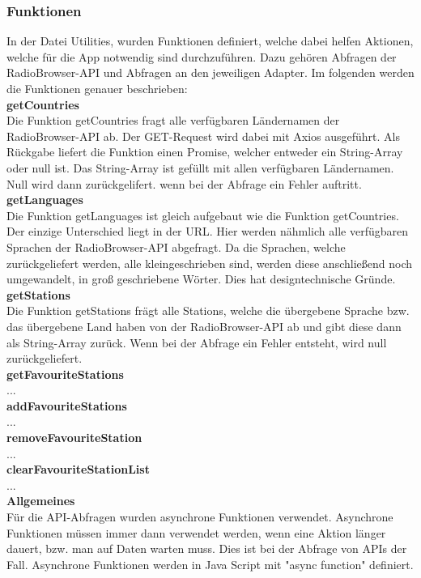 \documentclass[]{article}
\begin{document}
\subsubsection{Funktionen}
In der Datei Utilities, wurden Funktionen definiert, welche dabei helfen Aktionen, welche für die App notwendig sind durchzuführen. Dazu gehören Abfragen der RadioBrowser-API und Abfragen an den jeweiligen Adapter. Im folgenden werden die Funktionen genauer beschrieben: \newline \\
\textbf{getCountries} \\
Die Funktion getCountries fragt alle verfügbaren Ländernamen der RadioBrowser-API ab. Der GET-Request wird dabei mit Axios ausgeführt. Als Rückgabe liefert die Funktion einen Promise, welcher entweder ein String-Array oder null ist. Das String-Array ist gefüllt mit allen verfügbaren Ländernamen. Null wird dann zurückgelifert. wenn bei der Abfrage ein Fehler auftritt. \newline \\
\textbf{getLanguages} \\
Die Funktion getLanguages ist gleich aufgebaut wie die Funktion getCountries. Der einzige Unterschied liegt in der URL. Hier werden nähmlich alle verfügbaren Sprachen der RadioBrowser-API abgefragt. Da die Sprachen, welche zurückgeliefert werden, alle kleingeschrieben sind, werden diese anschließend noch umgewandelt, in groß geschriebene Wörter. Dies hat designtechnische Gründe. \newline \\
\textbf{getStations} \\
Die Funktion getStations frägt alle Stations, welche die übergebene Sprache bzw. das übergebene Land haben von der RadioBrowser-API ab und gibt diese dann als String-Array zurück. Wenn bei der Abfrage ein Fehler entsteht, wird null zurückgeliefert. \newline \\
\textbf{getFavouriteStations} \\
... \newline \\
\textbf{addFavouriteStations} \\
... \newline \\
\textbf{removeFavouriteStation} \\
... \newline \\
\textbf{clearFavouriteStationList} \\
... \newline \\
\textbf{Allgemeines} \\
Für die API-Abfragen wurden asynchrone Funktionen verwendet. Asynchrone Funktionen müssen immer dann verwendet werden, wenn eine Aktion länger dauert, bzw. man auf Daten warten muss. Dies ist bei der Abfrage von APIs der Fall. Asynchrone Funktionen werden in Java Script mit "async function" definiert.
\end{document}
